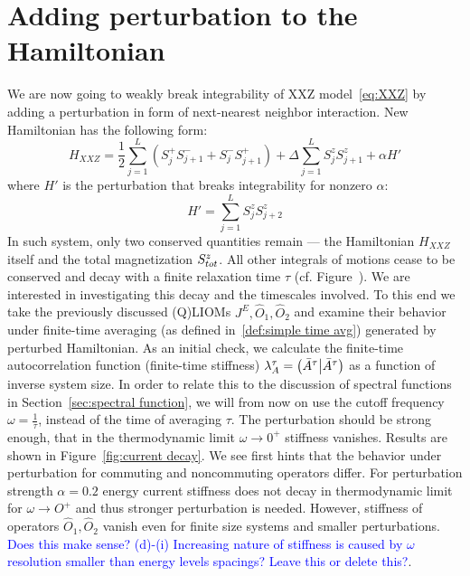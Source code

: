 \section{Adding perturbation to the Hamiltonian}
We are now going to weakly break integrability of XXZ model~\eqref{eq:XXZ} 
by adding a perturbation in form of next-nearest neighbor interaction.
New Hamiltonian has the following form:
\begin{equation}
    H_{XXZ} = \frac{1}{2}\sum_{j = 1}^{L}\left( S^{+}_{j} S^{-}_{j+1} + 
    S^{-}_{j}S^{+}_{j+1} \right) + \Delta\sum_{j = 1}^{L} S^{z}_{j}S^{z}_{j+1}
    + \alpha H'
    \label{eq:HXXZ perturbed}
\end{equation}
where \(H'\) is the perturbation that breaks integrability for nonzero \(\alpha \):
\begin{equation}
    H'=\sum_{j = 1}^{L} S^{z}_{j}S^{z}_{j+2}
    \label{eq:perturbation}
\end{equation}
In such system, only two conserved quantities remain --- the Hamiltonian \(H_{XXZ}\) itself 
and the total magnetization \(S^{z}_{tot}\). All other integrals of motions cease to be conserved
and decay with a finite relaxation time \(\tau\) (cf. Figure~).
We are interested in investigating this decay and the timescales involved.
To this end we take the previously discussed (Q)LIOMs \(J^E, \hat{O}_1,\hat{O}_2\)
and examine their behavior under finite-time averaging 
(as defined in~\eqref{def:simple time avg}) generated by perturbed Hamiltonian.
As an initial check, we calculate the finite-time autocorrelation function (finite-time stiffness)
\(\lambda^{\tau}_A = \left(\bar{A}^{\tau} \middle| \bar{A}^{\tau}\right)\) as a function of inverse system size.
In order to relate this to the discussion of spectral functions in Section~\ref{sec:spectral function},
we will from now on use the cutoff frequency \(\omega = \frac{1}{\tau}\), instead of the time of
averaging \(\tau\). The perturbation should be strong enough, that in the thermodynamic limit
\(\omega \to 0^+\) stiffness vanishes. Results are shown in Figure~\ref{fig:current decay}.
We see first hints that the behavior under perturbation for commuting and noncommuting operators
differ. For perturbation strength \(\alpha=0.2\) energy current stiffness does
not decay in thermodynamic limit for \(\omega \to O^+\) and thus stronger perturbation is needed.
However, stiffness of operators \(\hat{O}_1,\hat{O}_2\) vanish even for finite size systems
and smaller perturbations. \textcolor{blue}{Does this make sense? (d)-(i) Increasing nature of
stiffness is caused by \(\omega\) resolution smaller than energy levels spacings? Leave this or
delete this?}.
